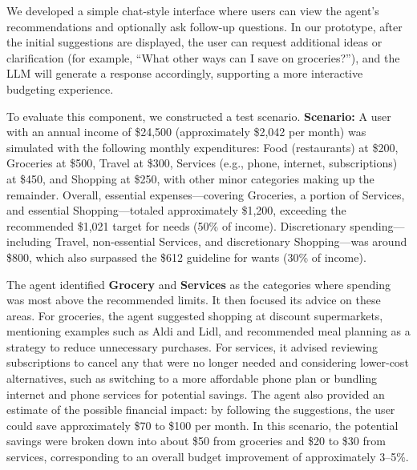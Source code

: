 \documentclass[conference]{IEEEtran}
\begin{document}
We developed a simple chat-style interface where users can view the agent’s recommendations and optionally ask follow-up questions. In our prototype, after the initial suggestions are displayed, the user can request additional ideas or clarification (for example, “What other ways can I save on groceries?”), and the LLM will generate a response accordingly, supporting a more interactive budgeting experience.

To evaluate this component, we constructed a test scenario. \textbf{Scenario:} A user with an annual income of \$24,500 (approximately \$2{,}042 per month) was simulated with the following monthly expenditures: Food (restaurants) at \$200, Groceries at \$500, Travel at \$300, Services (e.g., phone, internet, subscriptions) at \$450, and Shopping at \$250, with other minor categories making up the remainder. Overall, essential expenses—covering Groceries, a portion of Services, and essential Shopping—totaled approximately \$1,200, exceeding the recommended \$1,021 target for needs (50\% of income). Discretionary spending—including Travel, non-essential Services, and discretionary Shopping—was around \$800, which also surpassed the \$612 guideline for wants (30\% of income).

The agent identified \textbf{Grocery} and \textbf{Services} as the categories where spending was most above the recommended limits. It then focused its advice on these areas. For groceries, the agent suggested shopping at discount supermarkets, mentioning examples such as Aldi and Lidl, and recommended meal planning as a strategy to reduce unnecessary purchases. For services, it advised reviewing subscriptions to cancel any that were no longer needed and considering lower-cost alternatives, such as switching to a more affordable phone plan or bundling internet and phone services for potential savings.
The agent also provided an estimate of the possible financial impact: by following the suggestions, the user could save approximately \$70 to \$100 per month. In this scenario, the potential savings were broken down into about \$50 from groceries and \$20 to \$30 from services, corresponding to an overall budget improvement of approximately 3--5\%.



\begin{table*}[htbp]
  \centering
  \caption{Budget Optimization Recommendations (Example Scenario)}
  \label{tab:budget_optimization_recommendations}
\end{table*}
\end{document}
